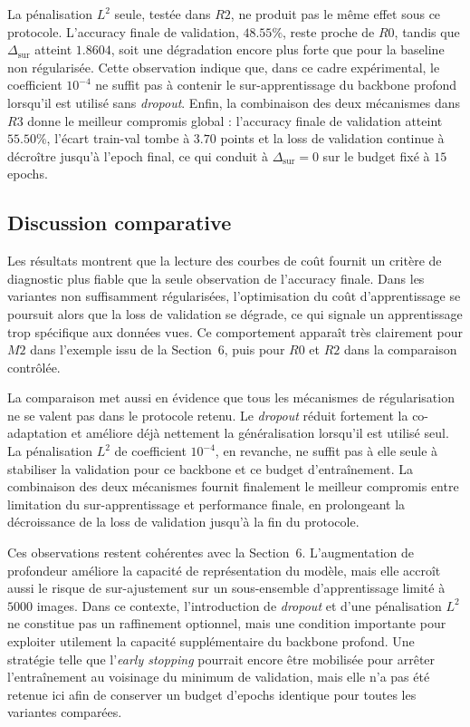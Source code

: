 La p\'enalisation $L^2$ seule, test\'ee dans $R2$, ne produit pas le m\^eme effet sous ce protocole. L'accuracy finale de validation, $48.55\%$, reste proche de $R0$, tandis que $\Delta_{\mathrm{sur}}$ atteint $1.8604$, soit une d\'egradation encore plus forte que pour la baseline non r\'egularis\'ee. Cette observation indique que, dans ce cadre exp\'erimental, le coefficient $10^{-4}$ ne suffit pas \`a contenir le sur-apprentissage du backbone profond lorsqu'il est utilis\'e sans \textit{dropout}. Enfin, la combinaison des deux m\'ecanismes dans $R3$ donne le meilleur compromis global : l'accuracy finale de validation atteint $55.50\%$, l'\'ecart train-val tombe \`a $3.70$ points et la loss de validation continue \`a d\'ecro\^itre jusqu'\`a l'epoch final, ce qui conduit \`a $\Delta_{\mathrm{sur}}=0$ sur le budget fix\'e \`a $15$ epochs.

\subsection{Discussion comparative}
Les r\'esultats montrent que la lecture des courbes de co\^ut fournit un crit\`ere de diagnostic plus fiable que la seule observation de l'accuracy finale. Dans les variantes non suffisamment r\'egularis\'ees, l'optimisation du co\^ut d'apprentissage se poursuit alors que la loss de validation se d\'egrade, ce qui signale un apprentissage trop sp\'ecifique aux donn\'ees vues. Ce comportement appara\^it tr\`es clairement pour $M2$ dans l'exemple issu de la Section~6, puis pour $R0$ et $R2$ dans la comparaison contr\^ol\'ee.

La comparaison met aussi en \'evidence que tous les m\'ecanismes de r\'egularisation ne se valent pas dans le protocole retenu. Le \textit{dropout} r\'eduit fortement la co-adaptation et am\'eliore d\'ej\`a nettement la g\'en\'eralisation lorsqu'il est utilis\'e seul. La p\'enalisation $L^2$ de coefficient $10^{-4}$, en revanche, ne suffit pas \`a elle seule \`a stabiliser la validation pour ce backbone et ce budget d'entra\^inement. La combinaison des deux m\'ecanismes fournit finalement le meilleur compromis entre limitation du sur-apprentissage et performance finale, en prolongeant la d\'ecroissance de la loss de validation jusqu'\`a la fin du protocole.

Ces observations restent coh\'erentes avec la Section~6. L'augmentation de profondeur am\'eliore la capacit\'e de repr\'esentation du mod\`ele, mais elle accro\^it aussi le risque de sur-ajustement sur un sous-ensemble d'apprentissage limit\'e \`a $5000$ images. Dans ce contexte, l'introduction de \textit{dropout} et d'une p\'enalisation $L^2$ ne constitue pas un raffinement optionnel, mais une condition importante pour exploiter utilement la capacit\'e suppl\'ementaire du backbone profond. Une strat\'egie telle que l'\textit{early stopping} pourrait encore \^etre mobilis\'ee pour arr\^eter l'entra\^inement au voisinage du minimum de validation, mais elle n'a pas \'et\'e retenue ici afin de conserver un budget d'epochs identique pour toutes les variantes compar\'ees.
